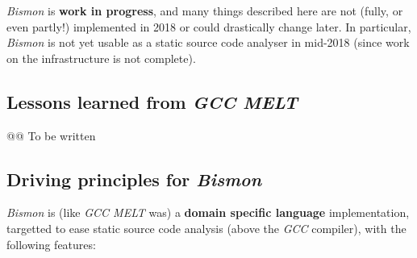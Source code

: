 {\large \textit{Bismon} is \textbf{work in progress}}, and many things
described here are not (fully, or even partly!) implemented in 2018 or
could drastically change later. In particular, \textit{Bismon} is not
yet usable as a static source code analyser in mid-2018 (since work on
the infrastructure is not complete).

\bigskip

\subsection{Lessons learned from \textit{GCC MELT}}

@@ To be written

\subsection{Driving principles for  \textit{Bismon}}

\textit{Bismon} is (like \textit{GCC MELT} was) a \textbf{domain
  specific language} implementation, targetted to ease static source
code analysis (above the \textit{GCC} compiler), with the following
features:

